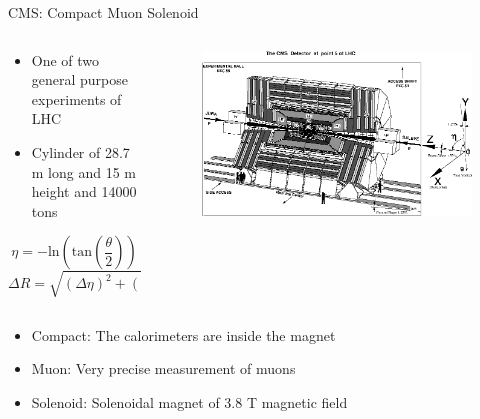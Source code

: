 \iffalse
\begin{frame}{CMS: Compact Muon Solenoid}
\vspace{-.2cm}

\begin{columns}
\begin{column}{.30\textwidth}
\begin{block}{}
\begin{itemize}\scriptsize
\item One of two general purpose experiments of LHC
\item Cylinder of 28.7 m long and 15 m height and 14000 tons
\end{itemize}
\tiny{
\begin{equation*}  
\eta = -\text{ln}\left( \text{tan}\left(\frac{\theta}{2}\right)\right)
\end{equation*}
\begin{equation*}
\Delta R=\sqrt{(\Delta\eta)^{2}+(\Delta\phi)^{2}}
\end{equation*}
}%
\end{block}
\end{column}

\begin{column}{.70\textwidth}
\begin{figure}[!Hhtbp]
  \begin{center}
    \includegraphics[width=\textwidth]{../figs/CMS_coordinates.jpg}
  \end{center}
\end{figure}
\end{column}
\end{columns}

\vspace{-.2cm}
\begin{block}{}
\begin{itemize}\scriptsize
\item Compact: The calorimeters are inside the magnet
\item Muon: Very precise measurement of muons
\item Solenoid: Solenoidal magnet of 3.8 T magnetic field
\end{itemize}
\end{block}

\end{frame}


